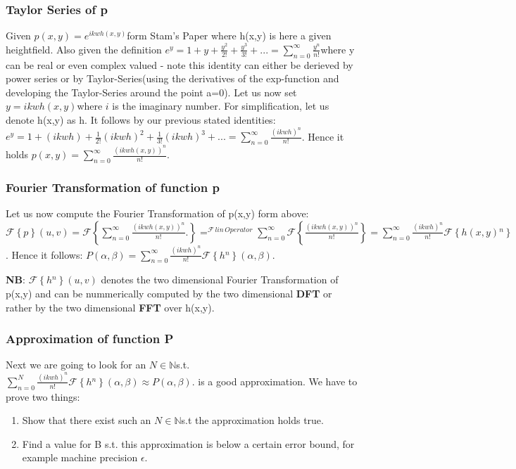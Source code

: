 \subsubsection{Taylor Series of p}

Given $p(x,y)=e^{ikwh(x,y)}$form Stam's Paper where h(x,y) is here
a given heightfield. Also given the definition $e^{y}=1+y+\frac{y^{2}}{2!}+\frac{y^{3}}{3!}+...=\sum_{n=0}^{\infty}\frac{y^{n}}{n!}$where
y can be real or even complex valued - note this identity can either
be derieved by power series or by Taylor-Series(using the derivatives
of the exp-function and developing the Taylor-Series around the point
a=0). Let us now set $y=ikwh(x,y)$where $i$ is the imaginary number.
For simplification, let us denote h(x,y) as h. It follows by our previous
stated identities: $e^{y}=1+(ikwh)+\frac{1}{2!}(ikwh)^{2}+\frac{1}{3!}(ikwh)^{3}+...=\sum_{n=0}^{\infty}\frac{(ikwh)^{n}}{n!}$.
Hence it holds $p(x,y)=\sum_{n=0}^{\infty}\frac{(ikwh(x,y))^{n}}{n!}.$


\subsubsection{Fourier Transformation of function p}

Let us now compute the Fourier Transformation of p(x,y) form above:$\mathcal{F}\left\{ p\right\} (u,v)=\mathcal{F}\left\{ \sum_{n=0}^{\infty}\frac{(ikwh(x,y))^{n}}{n!}.\right\} =^{\mathcal{F}\, lin\, Operator}\sum_{n=0}^{\infty}\mathcal{F}\left\{ \frac{(ikwh(x,y))^{n}}{n!}\right\} =\sum_{n=0}^{\infty}\frac{(ikwh)^{n}}{n!}\mathcal{F}\left\{ h(x,y){}^{n}\right\} $.
Hence it follows: $P(\alpha,\beta)=\sum_{n=0}^{\infty}\frac{(ikwh)^{n}}{n!}\mathcal{F}\left\{ h{}^{n}\right\} (\alpha,\beta)$.

\textbf{NB}: $\mathcal{F}\left\{ h{}^{n}\right\} (u,v)$ denotes the
two dimensional Fourier Transformation of p(x,y) and can be nummerically
computed by the two dimensional \textbf{DFT} or rather by the two
dimensional \textbf{FFT} over h(x,y). 


\subsubsection{Approximation of function P}

Next we are going to look for an $N\mathbb{\in N}$s.t. $\sum_{n=0}^{N}\frac{(ikwh)^{n}}{n!}\mathcal{F}\left\{ h{}^{n}\right\} (\alpha,\beta)\approx P(\alpha,\beta)$.
is a good approximation. We have to prove two things:
\begin{enumerate}
\item Show that there exist such an $N\mathbb{\in N}$s.t the approximation
holds true.
\item Find a value for B s.t. this approximation is below a certain error
bound, for example machine precision $\epsilon$. 
\end{enumerate}

